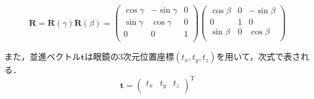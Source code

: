 \begin{equation}
{
  \bm{R}
  = \bm{R}(\gamma)\bm{R}(\beta)
  = \left(
    \begin{array}{ccc}
      \cos{\gamma} & -\sin{\gamma} & 0 \\
      \sin{\gamma} & \cos{\gamma} & 0 \\
      0 & 0 & 1 \\
    \end{array}
  \right)
  \left(
    \begin{array}{cccc}
      \cos{\beta} & 0 & -\sin{\beta} \\
      0 & 1 & 0 \\
      \sin{\beta} & 0 & \cos{\beta} \\
    \end{array}
  \right)
}
\end{equation}

また，並進ベクトル$ \bm{t} $は眼鏡の3次元位置座標$ (t_x, t_y, t_z) $を用いて，次式で表される．
%
\begin{equation}
{
  \bm{t}
  = \left(
    \begin{array}{ccc}
      t_x & t_y & t_z \\
    \end{array}
  \right)^{\mathrm{T}}
}
\end{equation}
%

